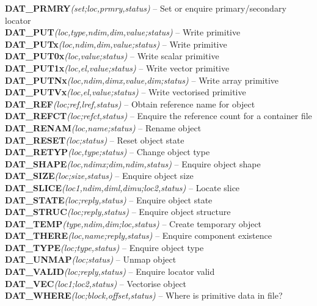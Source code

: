 \documentclass[11pt]{article}
\newcommand{\htmlref}[2]{#1}
\newcommand{\st}[1]{{\em{#1}}}
\begin{document}
{\bf \htmlref{DAT\_PRMRY}{DAT_PRMRY}}\st{(set;loc,prmry,status)} -- Set or enquire
primary/secondary locator \\
{\bf \htmlref{DAT\_PUT}{DAT_PUT}}\st{(loc,type,ndim,dim,value;status)} -- Write primitive \\
{\bf \htmlref{DAT\_PUTx}{DAT_PUTx}}\st{(loc,ndim,dim,value;status)} -- Write primitive \\
{\bf \htmlref{DAT\_PUT0x}{DAT_PUT0x}}\st{(loc,value;status)} -- Write scalar primitive\\
{\bf \htmlref{DAT\_PUT1x}{DAT_PUT1x}}\st{(loc,el,value;status)} -- Write vector primitive\\
{\bf \htmlref{DAT\_PUTNx}{DAT_PUTNx}}\st{(loc,ndim,dimx,value,dim;status)} -- Write array primitive\\
{\bf \htmlref{DAT\_PUTVx}{DAT_PUTVx}}\st{(loc,el,value;status)} -- Write vectorised primitive\\
{\bf \htmlref{DAT\_REF}{DAT_REF}}\st{(loc;ref,lref,status)} -- Obtain reference name for object \\
{\bf \htmlref{DAT\_REFCT}{DAT_REFCT}}\st{(loc;refct,status)} -- Enquire the reference count for
a container file \\
{\bf \htmlref{DAT\_RENAM}{DAT_RENAM}}\st{(loc,name;status)} -- Rename object \\
{\bf \htmlref{DAT\_RESET}{DAT_RESET}}\st{(loc;status)} -- Reset object state \\
{\bf \htmlref{DAT\_RETYP}{DAT_RETYP}}\st{(loc,type;status)} -- Change object type \\
{\bf \htmlref{DAT\_SHAPE}{DAT_SHAPE}}\st{(loc,ndimx;dim,ndim,status)} -- Enquire object shape \\
{\bf \htmlref{DAT\_SIZE}{DAT_SIZE}}\st{(loc;size,status)} -- Enquire object size \\
{\bf \htmlref{DAT\_SLICE}{DAT_SLICE}}\st{(loc1,ndim,diml,dimu;loc2,status)} -- Locate slice \\
{\bf \htmlref{DAT\_STATE}{DAT_STATE}}\st{(loc;reply,status)} -- Enquire object state \\
{\bf \htmlref{DAT\_STRUC}{DAT_STRUC}}\st{(loc;reply,status)} -- Enquire object structure \\
{\bf \htmlref{DAT\_TEMP}{DAT_TEMP}}\st{(type,ndim,dim;loc,status)} -- Create temporary object \\
{\bf \htmlref{DAT\_THERE}{DAT_THERE}}\st{(loc,name;reply,status)} -- Enquire component existence \\
{\bf \htmlref{DAT\_TYPE}{DAT_TYPE}}\st{(loc;type,status)} -- Enquire object type \\
{\bf \htmlref{DAT\_UNMAP}{DAT_UNMAP}}\st{(loc;status)} -- Unmap object \\
{\bf \htmlref{DAT\_VALID}{DAT_VALID}}\st{(loc;reply,status)} -- Enquire locator valid \\
{\bf \htmlref{DAT\_VEC}{DAT_VEC}}\st{(loc1;loc2,status)} -- Vectorise object \\
{\bf \htmlref{DAT\_WHERE}{DAT_WHERE}}\st{(loc;block,offset,status)} -- Where is primitive data in file? \\
\end{document}

